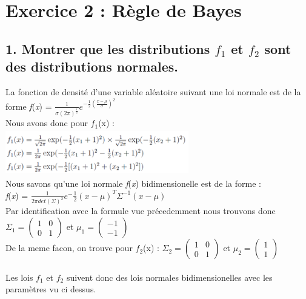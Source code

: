 \documentclass[a4paper, 8pt]{article}
\begin{document}
\newpage
\section*{Exercice 2 : Règle de Bayes}

\subsection*{1. Montrer que les distributions \textit{$f_{1}$} et \textit{$f_{2}$} sont des distributions normales.}
La fonction de densité d'une variable aléatoire suivant une loi normale est de la forme \textit{f}(\textit{x}) =
$\frac{1}{\sigma(2\pi)^{\frac{1}{2}}}$\textit{$e^{-\frac{1}{2}(\frac{x - \mu}{\sigma})^{2}}$}\\
Nous avons donc pour \textit{$f_{1}$}(x) :\\
\includegraphics[height = 2cm, width = 8cm]{plots/f1.png}
\\
Nous savons qu'une loi normale \textit{f}(\textit{x}) bidimensionelle est de la forme :\\
\textit{f}(\textit{x}) = $\frac{1}{2\pi det(\Sigma)^{{2}}}$\textit{$e^-\frac{1}{2}(x - \mu)^{T} \Sigma^{-1}(x - \mu)$}\\
Par identification avec la formule vue précedemment nous trouvons donc $\Sigma_{1} =
\begin{pmatrix}
1 & 0 \\
0 & 1
\end{pmatrix}$
et $\mu_{1} =
\begin{pmatrix}
-1 \\
-1
\end{pmatrix}$
\\
De la meme facon, on trouve pour \textit{$f_{2}$}(x) :
$\Sigma_{2} =
\begin{pmatrix}
1 & 0 \\
0 & 1
\end{pmatrix}$
et $\mu_{2} =
\begin{pmatrix}
1 \\
1
\end{pmatrix}$
\\
\\
Les lois \textit{$f_{1}$} et \textit{$f_{2}$} suivent donc des lois normales bidimensionelles avec les paramètres vu ci dessus.
\end{document}
